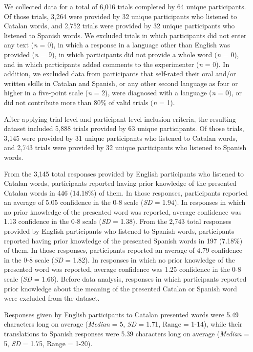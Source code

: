 \documentclass[
]{article}
\begin{document}
We collected data for a total of 6,016 trials completed by 64 unique
participants. Of those trials, 3,264 were provided by 32 unique
participants who listened to Catalan words, and 2,752 trials were
provided by 32 unique participants who listened to Spanish words. We
excluded trials in which participants did not enter any text (\emph{n} =
0), in which a response in a language other than English was provided
(\emph{n} = 9), in which participants did not provide a whole word
(\emph{n} = 0), and in which participants added comments to the
experimenter (\emph{n} = 0). In addition, we excluded data from
participants that self-rated their oral and/or written skills in Catalan
and Spanish, or any other second language as four or higher in a
five-point scale (\emph{n} = 2), were diagnosed with a language
(\emph{n} = 0), or did not contribute more than 80\% of valid trials
(\emph{n} = 1).

After applying trial-level and participant-level inclusion criteria, the
resulting dataset included 5,888 trials provided by 63 unique
participants. Of those trials, 3,145 were provided by 31 unique
participants who listened to Catalan words, and 2,743 trials were
provided by 32 unique participants who listened to Spanish words.

From the 3,145 total responses provided by English participants who
listened to Catalan words, participants reported having prior knowledge
of the presented Catalan words in 446 (14.18\%) of them. In those
responses, participants reported an average of 5.05 confidence in the
0-8 scale (\emph{SD} = 1.94). In responses in which no prior knowledge
of the presented word was reported, average confidence was 1.13
confidence in the 0-8 scale (\emph{SD} = 1.38). From the 2,743 total
responses provided by English participants who listened to Spanish
words, participants reported having prior knowledge of the presented
Spanish words in 197 (7.18\%) of them. In those responses, participants
reported an average of 4.79 confidence in the 0-8 scale (\emph{SD} =
1.82). In responses in which no prior knowledge of the presented word
was reported, average confidence was 1.25 confidence in the 0-8 scale
(\emph{SD} = 1.66). Before data analysis, responses in which
participants reported prior knowledge about the meaning of the presented
Catalan or Spanish word were excluded from the dataset.

Responses given by English participants to Catalan presented words were
5.49 characters long on average (\emph{Median} = 5, \emph{SD} = 1.71,
Range = 1-14), while their translations to Spanish responses were 5.39
characters long on average (\emph{Median} = 5, \emph{SD} = 1.75, Range =
1-20).
\end{document}

